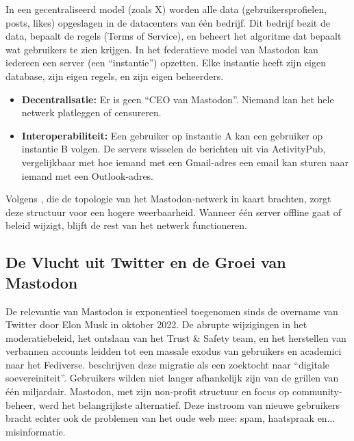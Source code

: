 In een gecentraliseerd model (zoals X) worden alle data (gebruikersprofielen, posts, likes) opgeslagen in de datacenters van één bedrijf. Dit bedrijf bezit de data, bepaalt de regels (Terms of Service), en beheert het algoritme dat bepaalt wat gebruikers te zien krijgen.
In het federatieve model van Mastodon kan iedereen een server (een ``instantie'') opzetten. Elke instantie heeft zijn eigen database, zijn eigen regels, en zijn eigen beheerders.
\begin{itemize}
    \item \textbf{Decentralisatie:} Er is geen ``CEO van Mastodon''. Niemand kan het hele netwerk platleggen of censureren.
    \item \textbf{Interoperabiliteit:} Een gebruiker op instantie A kan een gebruiker op instantie B volgen. De servers wisselen de berichten uit via ActivityPub, vergelijkbaar met hoe iemand met een Gmail-adres een email kan sturen naar iemand met een Outlook-adres.
\end{itemize}
Volgens \textcite{LaCava2023}, die de topologie van het Mastodon-netwerk in kaart brachten, zorgt deze structuur voor een hogere weerbaarheid. Wanneer één server offline gaat of beleid wijzigt, blijft de rest van het netwerk functioneren.

\subsection{De Vlucht uit Twitter en de Groei van Mastodon}
De relevantie van Mastodon is exponentieel toegenomen sinds de overname van Twitter door Elon Musk in oktober 2022. De abrupte wijzigingen in het moderatiebeleid, het ontslaan van het Trust \& Safety team, en het herstellen van verbannen accounts leidden tot een massale exodus van gebruikers en academici naar het Fediverse.
\textcite{Salaverria2024} beschrijven deze migratie als een zoektocht naar ``digitale soevereiniteit''. Gebruikers wilden niet langer afhankelijk zijn van de grillen van één miljardair. Mastodon, met zijn non-profit structuur en focus op community-beheer, werd het belangrijkste alternatief. Deze instroom van nieuwe gebruikers bracht echter ook de problemen van het oude web mee: spam, haatspraak en... misinformatie.


